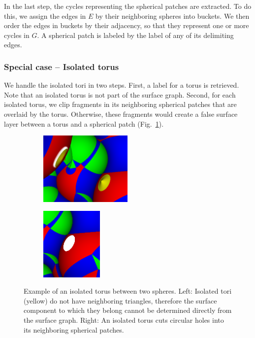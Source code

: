 In the last step, the cycles representing the spherical patches are extracted.
To do this, we assign the edges in $E$ by their neighboring spheres into buckets.
We then order the edges in buckets by their adjacency, so that they represent one or more cycles in $G$.
A spherical patch is labeled by the label of any of its delimiting edges.

\subsubsection{Special case -- Isolated torus}
\label{sec:isolated}

We handle the isolated tori in two steps.
First, a label for a torus is retrieved. 
Note that an isolated torus is not part of the surface graph.
Second, for each isolated torus, we clip fragments in its neighboring spherical patches that are overlaid by the torus. 
Otherwise, these fragments would create a false surface layer between a torus and a spherical patch (Fig.~\ref{fig:isolated-hole}).

\begin{figure}[htp]
  \centering
  \begin{subfigure}[t]{0.55\columnwidth}
    \centering
    \includegraphics[height=1.4in]{image/isolated-cutaway2.png}
  \end{subfigure}%
  \quad
  \begin{subfigure}[t]{0.4\columnwidth}
    \centering
    \includegraphics[height=1.4in]{image/isolated-hole.png}
  \end{subfigure}
\caption{Example of an isolated torus between two spheres.
	Left: Isolated tori (yellow) do not have neighboring triangles, therefore the surface component to which they belong cannot be determined directly from the surface graph. Right: An isolated torus cuts circular holes into its neighboring spherical patches.}
\label{fig:isolated-hole}
\end{figure}

